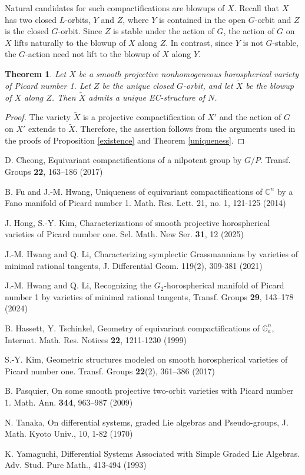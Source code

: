 \documentclass{amsart}
\newtheorem{theorem}{Theorem}
\theoremstyle{definition}
\theoremstyle{remark}
\newcommand{\C}{\mathbb{C}}
\begin{document}
Natural candidates for such compactifications are blowups of $X$. Recall that $X$ has two closed $L$-orbits, $Y$ and $Z$, where $Y$ is contained in the open $G$-orbit and $Z$ is the closed $G$-orbit. Since $Z$ is stable under the action of $G$, the action of $G$ on $X$ lifts naturally to the blowup of $X$ along $Z$. In contrast, since $Y$ is not $G$-stable, the $G$-action need not lift to the blowup of $X$ along $Y$.

\begin{theorem}
\label{blowup}
Let $X$ be a smooth projective nonhomogeneous horospherical variety of Picard number 1. Let $Z$ be the unique closed $G$-orbit, and let $\tilde{X}$ be the blowup of $X$ along $Z$. Then $\tilde{X}$ admits a unique EC-structure of $N$.
\end{theorem}

\begin{proof}
The variety $\tilde{X}$ is a projective compactification of $X'$ and the action of $G$ on $X'$ extends to $\tilde{X}$. Therefore, the assertion follows from the arguments used in the proofs of Proposition \ref{existence} and Theorem \ref{uniqueness}.
\end{proof}


\begin{thebibliography}{}

D. Cheong, Equivariant compactifications of a nilpotent group by \(G/P\). Transf. Groups \textbf{22}, 163–186 (2017)

B. Fu and J.-M. Hwang, Uniqueness of equivariant compactifications of \(\C^n\) by a Fano manifold of Picard number 1. Math. Res. Lett. 21, no. 1, 121-125 (2014) 
 
J. Hong, S.-Y. Kim, Characterizations of smooth projective horospherical varieties of Picard number one. Sel. Math. New Ser. \textbf{31}, 12 (2025)

J.-M. Hwang and Q. Li, Characterizing symplectic Grassmannians by varieties of minimal rational tangents, J. Differential Geom. 119(2), 309-381 (2021)

J.-M. Hwang and Q. Li, Recognizing the $G_2$-horospherical manifold of Picard number 1 by varieties of minimal rational tangents, Transf. Groups \textbf{29}, 143–178 (2024)

B. Hassett, Y. Tschinkel, Geometry of equivariant compactifications of $\mathbb{G}^n_a$, Internat. Math. Res. Notices \textbf{22}, 1211-1230 (1999)
 
S.-Y. Kim, Geometric structures modeled on smooth horospherical varieties of Picard number one. Transf. Groups \textbf{22}(2), 361–386 (2017)

B. Pasquier, On some smooth projective two-orbit varieties with Picard number 1. Math. Ann. \textbf{344}, 963–987 (2009)

N. Tanaka, On differential systems, graded Lie algebras and Pseudo-groups, J. Math. Kyoto Univ., 10, 1-82 (1970)

K. Yamaguchi, Differential Systems Associated with Simple Graded Lie Algebras. Adv. Stud. Pure Math., 413-494 (1993)

\end{thebibliography}
\end{document}
